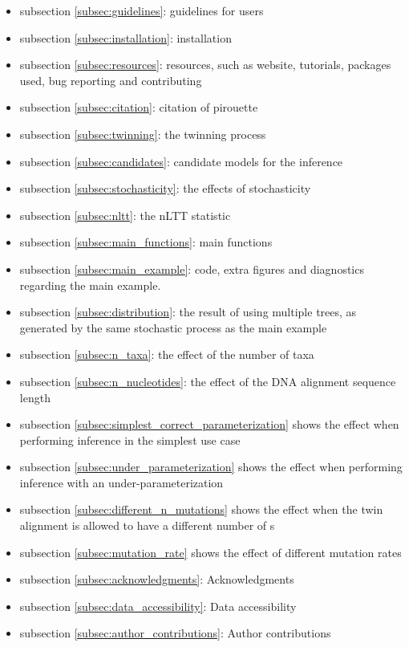 \begin{itemize}
  \item{
    subsection \ref{subsec:guidelines}: guidelines for users
  }
  \item{
    subsection \ref{subsec:installation}: installation
  }
  \item{
    subsection \ref{subsec:resources}: resources, such as 
    website, tutorials, packages used, bug reporting and contributing
  }
  \item{
    subsection \ref{subsec:citation}: citation of pirouette
  }
  \item{
    subsection \ref{subsec:twinning}: the
    twinning process
  }
  \item{
    subsection \ref{subsec:candidates}: candidate models for the inference
  }
  \item{
    subsection \ref{subsec:stochasticity}: the effects of stochasticity
  }
  \item{
    subsection \ref{subsec:nltt}: the
    nLTT statistic
  }
  \item{
    subsection \ref{subsec:main_functions}: main functions
  }
  \item{
    subsection \ref{subsec:main_example}: code, extra figures and
    diagnostics regarding the main example.
  }
  \item{
    subsection \ref{subsec:distribution}: the result of using 
    multiple trees, as generated by the
    same stochastic process as the main example
  }
  \item{
    subsection \ref{subsec:n_taxa}: the effect of the number of taxa
  }
  \item{
    subsection \ref{subsec:n_nucleotides}: the effect of the DNA
    alignment sequence length
  }
  \item{
    subsection \ref{subsec:simplest_correct_parameterization} shows the
    effect when performing inference in the simplest use case
  }
  \item{
    subsection \ref{subsec:under_parameterization} shows the
    effect when performing inference with an under-parameterization
  }
  \item{
    subsection \ref{subsec:different_n_mutations} shows the
    effect when the twin alignment is allowed to have a different
    number of s
  }
  \item{
    subsection \ref{subsec:mutation_rate} shows the
    effect of different mutation rates
  }
  \item{
    subsection \ref{subsec:acknowledgments}: Acknowledgments
  }
  \item{
    subsection \ref{subsec:data_accessibility}: Data accessibility
  }
  \item{
    subsection \ref{subsec:author_contributions}: Author contributions
  }
\end{itemize}


